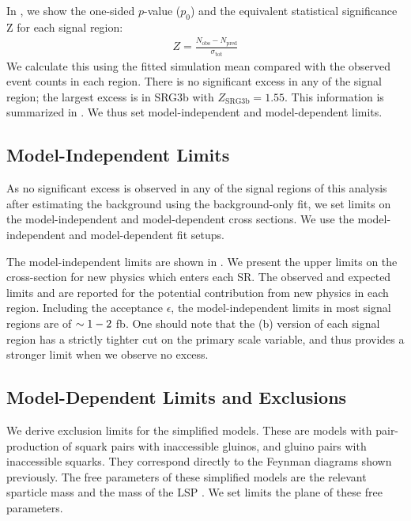 In , we show the one-sided $p$-value ($p_0$) and the equivalent statistical significance Z for each signal region:
\begin{align}
Z = \frac{N_{\mathrm{obs}} - N_{\mathrm{pred}}}{\sigma_{\mathrm{tot}}}
\end{align}
We calculate this using the fitted simulation mean compared with the observed event counts in each region.
There is no significant excess in any of the signal region; the largest excess is in SRG3b with $Z_{\text{SRG3b}} = 1.55$.
This information is summarized in .
We thus set model-independent and model-dependent limits.

\subsection{Model-Independent Limits}

As no significant excess is observed in any of the signal regions of this analysis after estimating the background using the background-only fit, we set limits on the model-independent and model-dependent cross sections.
We use the model-independent and model-dependent fit setups.

The model-independent limits are shown in .
We present the upper limits on the cross-section for new physics which enters each SR.
The observed and expected limits \sobs and \sexp are reported for the potential contribution from new physics in each region.
Including the acceptance $\epsilon$, the model-independent limits in most signal regions are of $\sim 1-2$ fb.
One should note that the (b) version of each signal region has a strictly tighter cut on the primary scale variable, and thus provides a stronger limit when we observe no excess.

\subsection{Model-Dependent Limits and Exclusions}

We derive exclusion limits for the simplified models.
These are models with pair-production of squark pairs with inaccessible gluinos, and gluino pairs with inaccessible squarks.
They correspond directly to the Feynman diagrams shown previously.
The free parameters of these simplified models are the relevant sparticle mass and the mass of the LSP \lsp.
We set limits the plane of these free parameters.

